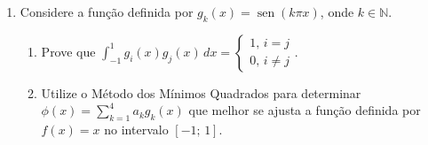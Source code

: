\documentclass[12pt,a4paper]{article}
\DeclareMathOperator{\sen}{sen}
\begin{document}
\begin{enumerate}
  \item Considere a função definida por $g_k(x)=\sen(k\pi x)$, onde $k\in\mathbb{N}$.
    \begin{enumerate}
      \item Prove que $\displaystyle\int_{-1}^1 g_i(x)g_j(x)\,dx = \begin{cases}1,\,i = j \\ 0,\,i\neq j\end{cases}$.
      \item Utilize o Método dos Mínimos Quadrados para determinar $\displaystyle \phi(x) = \sum_{k=1}^4 a_kg_k(x)$
      que melhor se ajusta a função definida por $f(x) = x$ no intervalo $[-1;\, 1]$.
   \end{enumerate}
\end{enumerate}
\end{document}
